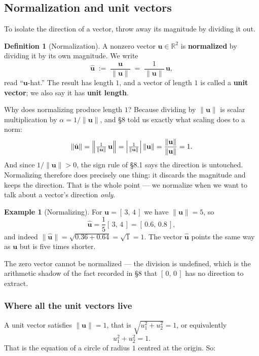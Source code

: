 \documentclass[11pt]{article}
\theoremstyle{definition}
\newtheorem{defn}{Definition}
\newtheorem{ex}{Example}
\theoremstyle{remark}
\newcommand{\R}{\mathbb{R}}
\newcommand{\vc}[1]{\mathbf{#1}}
\newcommand{\norm}[1]{\lVert #1\rVert}
\newcommand{\uv}[1]{\hat{\vc{#1}}}                 %
\begin{document}
\subsection{Normalization and unit vectors}
To isolate the direction of a vector, throw away its magnitude by dividing it
out.

\begin{defn}[Normalization]
A nonzero vector $\vc{u}\in\R^{2}$ is \textbf{normalized} by dividing it by its
own magnitude. We write
\[
  \uv{u} \;:=\; \frac{\vc{u}}{\norm{\vc{u}}}
  \;=\; \frac{1}{\norm{\vc{u}}}\,\vc{u},
\]
read ``$\vc{u}$-hat.'' The result has length $1$, and a vector of length $1$ is
called a \textbf{unit vector}; we also say it has \textbf{unit length}.
\end{defn}

\noindent Why does normalizing produce length $1$? Because dividing by
$\norm{\vc{u}}$ is scalar multiplication by $\alpha=1/\norm{\vc{u}}$, and \S8
told us exactly what scaling does to a norm:
\[
  \norm{\uv{u}}
  = \Bigl\lVert \tfrac{1}{\norm{\vc{u}}}\,\vc{u}\Bigr\rVert
  = \left\lvert \tfrac{1}{\norm{\vc{u}}}\right\rvert \norm{\vc{u}}
  = \frac{\norm{\vc{u}}}{\norm{\vc{u}}}
  = 1 .
\]
And since $1/\norm{\vc{u}}>0$, the sign rule of \S8.1 says the direction is
untouched. Normalizing therefore does precisely one thing: it discards the
magnitude and keeps the direction. That is the whole point --- we normalize when
we want to talk about a vector's direction \emph{only}.

\begin{ex}[Normalizing]
For $\vc{u}=[\,3,\,4\,]$ we have $\norm{\vc{u}}=5$, so
\[
  \uv{u}=\frac{1}{5}[\,3,\,4\,]=[\,0.6,\,0.8\,],
\]
and indeed $\norm{\uv{u}}=\sqrt{0.36+0.64}=\sqrt{1}=1$. The vector $\uv{u}$
points the same way as $\vc{u}$ but is five times shorter.
\end{ex}

\noindent The zero vector cannot be normalized --- the division is undefined,
which is the arithmetic shadow of the fact recorded in \S8 that
$[\,0,\,0\,]$ has no direction to extract.

\subsubsection*{Where all the unit vectors live}
A unit vector satisfies $\norm{\vc{u}}=1$, that is $\sqrt{u_1^{2}+u_2^{2}}=1$,
or equivalently
\[
  u_1^{2}+u_2^{2}=1 .
\]
That is the equation of a circle of radius $1$ centred at the origin. So:
\end{document}

